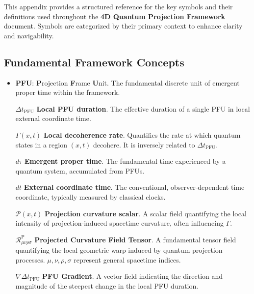 \documentclass[12pt,a4paper]{article}
\numberwithin{equation}{section}
\begin{document}
This appendix provides a structured reference for the key symbols and their definitions used throughout the \textbf{4D Quantum Projection Framework} document. Symbols are categorized by their primary context to enhance clarity and navigability.

\subsection{Fundamental Framework Concepts}
\begin{itemize}
    \item \textbf{PFU}: \textbf{P}rojection \textbf{F}rame \textbf{U}nit. The fundamental discrete unit of emergent proper time within the framework.
    \item[$\Delta t_{\text{PFU}}$] \textbf{Local PFU duration}. The effective duration of a single PFU in local external coordinate time.
    \item[$\Gamma(x, t)$] \textbf{Local decoherence rate}. Quantifies the rate at which quantum states in a region $(x, t)$ decohere. It is inversely related to $\Delta t_{\text{PFU}}$.
    \item[$d\tau$] \textbf{Emergent proper time}. The fundamental time experienced by a quantum system, accumulated from PFUs.
    \item[$dt$] \textbf{External coordinate time}. The conventional, observer-dependent time coordinate, typically measured by classical clocks.
    \item[$\mathcal{P}(x, t)$] \textbf{Projection curvature scalar}. A scalar field quantifying the local intensity of projection-induced spacetime curvature, often influencing $\Gamma$.
    \item[$\mathcal{R}_{\mu\nu\rho\sigma}^{\text{P}}$] \textbf{Projected Curvature Field Tensor}. A fundamental tensor field quantifying the local geometric warp induced by quantum projection processes. $\mu, \nu, \rho, \sigma$ represent general spacetime indices.
    \item[$\nabla \Delta t_{\text{PFU}}$] \textbf{PFU Gradient}. A vector field indicating the direction and magnitude of the steepest change in the local PFU duration.
\end{itemize}
\end{document}
